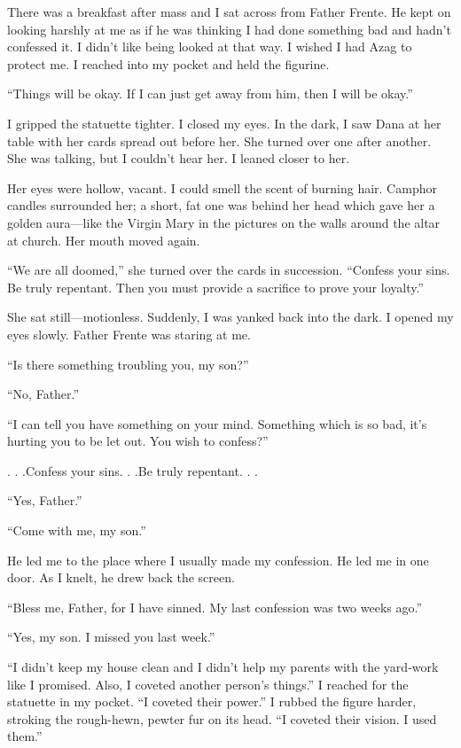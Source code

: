 \documentclass[
]{article}
\begin{document}
There was a breakfast after mass and I sat across from Father Frente. He
kept on looking harshly at me as if he was thinking I had done something
bad and hadn't confessed it. I didn't like being looked at that way. I
wished I had Azag to protect me. I reached into my pocket and held the
figurine.

``Things will be okay. If I can just get away from him, then I will be
okay.''

I gripped the statuette tighter. I closed my eyes. In the dark, I saw
Dana at her table with her cards spread out before her. She turned over
one after another. She was talking, but I couldn't hear her. I leaned
closer to her.

Her eyes were hollow, vacant. I could smell the scent of burning hair.
Camphor candles surrounded her; a short, fat one was behind her head
which gave her a golden aura---like the Virgin Mary in the pictures on
the walls around the altar at church. Her mouth moved again.

``We are all doomed,'' she turned over the cards in succession.
``Confess your sins. Be truly repentant. Then you must provide a
sacrifice to prove your loyalty.''

She sat still---motionless. Suddenly, I was yanked back into the dark. I
opened my eyes slowly. Father Frente was staring at me.

``Is there something troubling you, my son?''

``No, Father.''

``I can tell you have something on your mind. Something which is so bad,
it's hurting you to be let out. You wish to confess?''

. . .Confess your sins. . .Be truly repentant. . .

``Yes, Father.''

``Come with me, my son.''

He led me to the place where I usually made my confession. He led me in
one door. As I knelt, he drew back the screen.

``Bless me, Father, for I have sinned. My last confession was two weeks
ago.''

``Yes, my son. I missed you last week.''

``I didn't keep my house clean and I didn't help my parents with the
yard-work like I promised. Also, I coveted another person's things.'' I
reached for the statuette in my pocket. ``I coveted their power.'' I
rubbed the figure harder, stroking the rough-hewn, pewter fur on its
head. ``I coveted their vision. I used them.''
\end{document}
